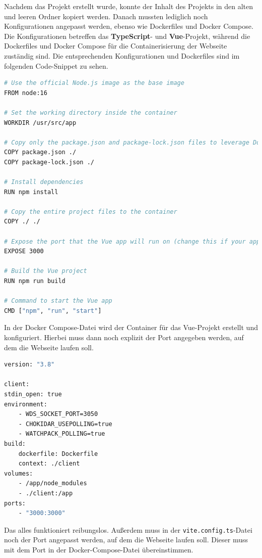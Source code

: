 Nachdem das Projekt erstellt wurde, konnte der Inhalt des Projekts in den alten und leeren Ordner kopiert werden. Danach mussten lediglich noch Konfigurationen angepasst werden, ebenso wie Dockerfiles und Docker Compose. Die Konfigurationen betreffen das \textbf{TypeScript}- und \textbf{Vue}-Projekt, während die Dockerfiles und Docker Compose für die Containerisierung der Webseite zuständig sind. Die entsprechenden Konfigurationen und Dockerfiles sind im folgenden Code-Snippet zu sehen.

\begin{lstlisting}[language={bash}, caption={Dockerfile für das Vue Projekt}]
# Use the official Node.js image as the base image
FROM node:16

# Set the working directory inside the container
WORKDIR /usr/src/app

# Copy only the package.json and package-lock.json files to leverage Docker cache
COPY package.json ./
COPY package-lock.json ./

# Install dependencies
RUN npm install

# Copy the entire project files to the container
COPY ./ ./

# Expose the port that the Vue app will run on (change this if your app uses a different port)
EXPOSE 3000

# Build the Vue project
RUN npm run build

# Command to start the Vue app
CMD ["npm", "run", "start"]
\end{lstlisting}

In der Docker Compose-Datei wird der Container für das Vue-Projekt erstellt und konfiguriert. Hierbei muss dann noch explizit der Port angegeben werden, auf dem die Webseite laufen soll.

\begin{lstlisting}[language={bash}, caption={Docker Compose für das Vue Projekt}]
version: "3.8"

client:
stdin_open: true
environment:
    - WDS_SOCKET_PORT=3050
    - CHOKIDAR_USEPOLLING=true
    - WATCHPACK_POLLING=true
build:
    dockerfile: Dockerfile
    context: ./client
volumes:
    - /app/node_modules
    - ./client:/app
ports:
    - "3000:3000"
\end{lstlisting}

Das alles funktioniert reibungslos. Außerdem muss in der \texttt{vite.config.ts}-Datei noch der Port angepasst werden, auf dem die Webseite laufen soll. Dieser muss mit dem Port in der Docker-Compose-Datei übereinstimmen.

